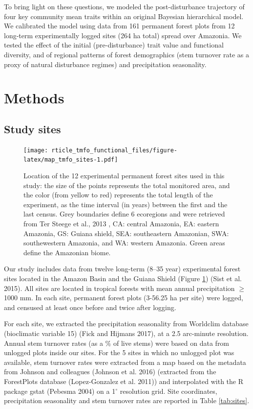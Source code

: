 \documentclass[]{elsarticle} %
\begin{document}
To bring light on these questions, we modeled the post-disturbance
trajectory of four key community mean traits within an original Bayesian
hierarchical model. We calibrated the model using data from 161
permanent forest plots from 12 long-term experimentally logged sites
(264 ha total) spread over Amazonia. We tested the effect of the initial
(pre-disturbance) trait value and functional diversity, and of regional
patterns of forest demographics (stem turnover rate as a proxy of
natural disturbance regimes) and precipitation seasonality.

\section{Methods}\label{methods}

\subsection{Study sites}\label{study-sites}

\begin{figure}
\centering
\texttt{[image: rticle\_tmfo\_functional\_files/figure-latex/map\_tmfo\_sites-1.pdf]}
\caption{\label{fig:map_tmfo}Location of the 12 experimental permanent
forest sites used in this study: the size of the points represents the
total monitored area, and the color (from yellow to red) represents the
total length of the experiment, as the time interval (in years) between
the first and the last census. Grey boundaries define 6 ecoregions and
were retrieved from Ter Steege et al., 2013 \cite{TerSteege2013}, CA:
central Amazonia, EA: eastern Amazonia, GS: Guiana shield, SEA:
southeastern Amazonian, SWA: southewestern Amazonia, and WA: western
Amazonia. Green areas define the Amazonian biome.}
\end{figure}

Our study includes data from twelve long-term (8--35 year) experimental
forest sites located in the Amazon Basin and the Guiana Shield (Figure
\ref{fig:map_tmfo}) (Sist et al. 2015). All sites are located in
tropical forests with mean annual precipitation \(\geq\) 1000 mm. In
each site, permanent forest plots (3-56.25 ha per site) were logged, and
censused at least once before and twice after logging.

For each site, we extracted the precipitation seasonality from Worldclim
database (bioclimatic variable 15) (Fick and Hijmans 2017), at a 2.5
arc-minute resolution. Annual stem turnover rates (as a \% of live
stems) were based on data from unlogged plots inside our sites. For the
5 sites in which no unlogged plot was available, stem turnover rates
were extracted from a map based on the metadata from Johnson and
colleagues (Johnson et al. 2016) (extracted from the ForestPlots
database (Lopez-Gonzalez et al. 2011)) and interpolated with the R
package gstat (Pebesma 2004) on a 1\(^\circ\) resolution grid. Site
coordinates, precipitation seasonality and stem turnover rates are
reported in Table \ref{tab:sites}.
\end{document}
